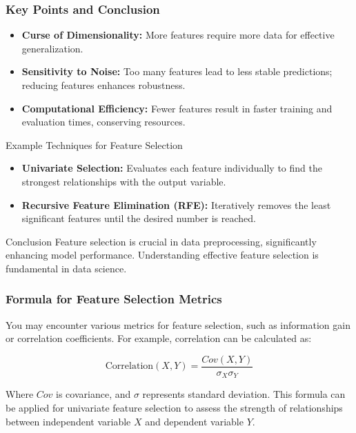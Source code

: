 \documentclass[aspectratio=169]{beamer}
\begin{document}
\begin{frame}[fragile]
    \frametitle{Key Points and Conclusion}
    \begin{itemize}
        \item \textbf{Curse of Dimensionality:} More features require more data for effective generalization.
        \item \textbf{Sensitivity to Noise:} Too many features lead to less stable predictions; reducing features enhances robustness.
        \item \textbf{Computational Efficiency:} Fewer features result in faster training and evaluation times, conserving resources.
    \end{itemize}

    \begin{block}{Example Techniques for Feature Selection}
        \begin{itemize}
            \item \textbf{Univariate Selection:} Evaluates each feature individually to find the strongest relationships with the output variable.
            \item \textbf{Recursive Feature Elimination (RFE):} Iteratively removes the least significant features until the desired number is reached.
        \end{itemize}
    \end{block}

    \begin{block}{Conclusion}
        Feature selection is crucial in data preprocessing, significantly enhancing model performance. Understanding effective feature selection is fundamental in data science.
    \end{block}
\end{frame}

\begin{frame}[fragile]
    \frametitle{Formula for Feature Selection Metrics}
    You may encounter various metrics for feature selection, such as information gain or correlation coefficients. For example, correlation can be calculated as:
    
    \begin{equation}
        \text{Correlation}(X, Y) = \frac{Cov(X,Y)}{\sigma_X \sigma_Y}
    \end{equation}
    
    Where \(Cov\) is covariance, and \(\sigma\) represents standard deviation. This formula can be applied for univariate feature selection to assess the strength of relationships between independent variable \(X\) and dependent variable \(Y\).
\end{frame}
\end{document}
